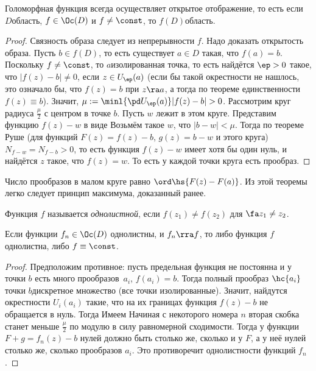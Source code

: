\documentclass[a4paper]{article}
\begin{document}
\begin{theorem}
Голоморфная функция всегда осуществляет открытое отображение, то есть если
$D$\т область, $f\in\Oc(D)$ и $f\neq\const$, то $f(D)$\т область.
\end{theorem}
\begin{proof}
Связность образа следует из непрерывности $f$. Надо доказать открытость образа. Пусть $b\in f(D)$,
то есть существует $a \in D$ такая, что $f(a)=b$. Поскольку $f\neq \const$, то $a$\т изолированная точка,
то есть найдётся $\ep > 0$ такое, что $|f(z) - b| \neq 0$, если $z \in U_\ep(a)$ (если бы такой окрестности
не нашлось, это означало бы, что $f(z) = b$ при $z\ra a$, а тогда по теореме единственности $f(z) \equiv b$).
Значит, $\mu := \minl{\pd U_\ep(a)} |f(z)-b| > 0$.
Рассмотрим круг радиуса $\frac\mu2$ с центром в точке $b$. Пусть $w$ лежит в этом круге.
Представим функцию $f(z)-w$ в виде
Возьмём такое $w$, что $|b-w|<\mu$. Тогда по теореме Руше (для функций $F(z) =f(z)-b$, $g(z)=b-w$ и этого круга) $N_{f-w}=N_{f-b}>0$, то есть функция $f(z)-w$ имеет
хотя бы один нуль, и найдётся $z$ такое, что $f(z)=w$. То есть у каждой точки круга есть прообраз.
\end{proof}
\begin{note}
Число прообразов в малом круге равно $\ord\hs{F(z)-F(a)}$. Из этой теоремы легко
следует принцип максимума, доказанный ранее.
\end{note}

\begin{df}
Функция $f$ называется \emph{однолистной}, если $f(z_1) \neq f(z_2)$ для $\fa z_1 \neq z_2$.
\end{df}

\begin{theorem}[Гурвица]
Если функции $f_n\in\Oc(D)$ однолистны, и $f_n \rra f$, то либо функция $f$ однолистна, либо $f \equiv \const$.
\end{theorem}
\begin{proof}
Предположим противное: пусть предельная функция не постоянна и у точки $b$ есть много прообразов~$a_i$,
 $f(a_i)=b$. Тогда полный прообраз $\hc{a_i}$ точки $b$\т дискретное множество (все точки изолированные).
Значит, найдутся окрестности $U_i(a_i)$ такие, что на их границах функция $f(z)-b$ не обращается в нуль.
Тогда
Имеем
Начиная с некоторого номера $n$ вторая скобка станет меньше $\frac\mu2$ по модулю в силу равномерной сходимости.
Тогда у функции $F +g = f_n(z)-b$ нулей должно быть столько же, сколько и у $F$, а у неё нулей столько же, сколько
прообразов $a_i$. Это противоречит однолистности функций $f_n$.
\end{proof}
\end{document}
